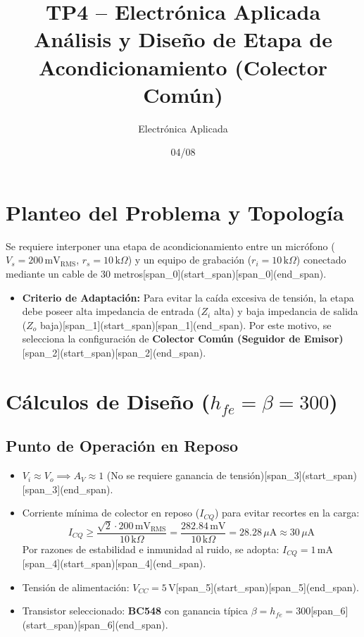 \documentclass[12pt, a4paper]{article}
\title{\textbf{TP4 -- Electrónica Aplicada}\\ \large Análisis y Diseño de Etapa de Acondicionamiento (Colector Común)}
\author{Electrónica Aplicada}
\date{04/08}
\begin{document}
\maketitle

\section{Planteo del Problema y Topología}
Se requiere interponer una etapa de acondicionamiento entre un micrófono ($V_s = 200\,\text{mV}_{\text{RMS}}$, $r_s = 10\,\text{k}\Omega$) y un equipo de grabación ($r_i = 10\,\text{k}\Omega$) conectado mediante un cable de 30 metros[span_0](start_span)[span_0](end_span).

\begin{itemize}
    \item \textbf{Criterio de Adaptación:} Para evitar la caída excesiva de tensión, la etapa debe poseer alta impedancia de entrada ($Z_i$ alta) y baja impedancia de salida ($Z_o$ baja)[span_1](start_span)[span_1](end_span). Por este motivo, se selecciona la configuración de \textbf{Colector Común (Seguidor de Emisor)}[span_2](start_span)[span_2](end_span).
\end{itemize}

\section{Cálculos de Diseño ($h_{fe} = \beta = 300$)}

\subsection{Punto de Operación en Reposo}
\begin{itemize}
    \item $V_i \approx V_o \implies A_V \approx 1$ (No se requiere ganancia de tensión)[span_3](start_span)[span_3](end_span).
    \item Corriente mínima de colector en reposo ($I_{CQ}$) para evitar recortes en la carga:
    \[
    I_{CQ} \ge \frac{\sqrt{2} \cdot 200\,\text{mV}_{\text{RMS}}}{10\,\text{k}\Omega} = \frac{282.84\,\text{mV}}{10\,\text{k}\Omega} = 28.28\,\mu\text{A} \approx 30\,\mu\text{A}
    \]
    Por razones de estabilidad e inmunidad al ruido, se adopta: $I_{CQ} = 1\,\text{mA}$[span_4](start_span)[span_4](end_span).
    \item Tensión de alimentación: $V_{CC} = 5\,\text{V}$[span_5](start_span)[span_5](end_span).
    \item Transistor seleccionado: \textbf{BC548} con ganancia típica $\beta = h_{fe} = 300$[span_6](start_span)[span_6](end_span).
\end{itemize}
\end{document}
